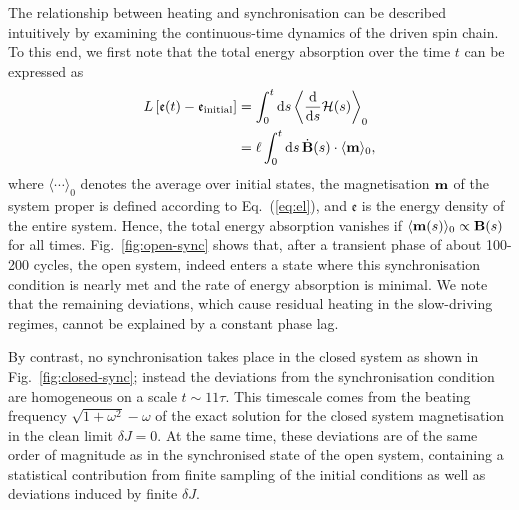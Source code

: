 \documentclass[aps,pre,twocolumn,notitlepage,floats,10pt]{revtex4-1}
\def\d{\mathrm{d}}
\newcommand{\beA}{\begin{equation}\begin{aligned}}
\newcommand{\eeA}{\end{aligned}\end{equation}}
\begin{document}
The relationship between heating and synchronisation can be described
intuitively by examining the continuous-time dynamics of the driven spin chain.
To this end, we first note that the total energy absorption over the time $t$
can be expressed as
\beA
L\left[\mathfrak{e}(t) - \mathfrak{e}_{\rm initial}\right]
&=
\int_0^t \d s\left\langle \frac{\d}{\d s} \mathcal{H}(s) \right\rangle_0 \\
&=
\ell \int_0^t \d s\, \dot{\bf B}(s) \cdot \langle {\bf m} \rangle_0 ,
\label{eq:sync-condition}
\eeA
where $\langle\cdots\rangle_0$ denotes the average over initial states, the
magnetisation ${\bf m}$ of the system proper is defined according to
Eq.~(\ref{eq:el}), and $\mathfrak{e}$ is the energy density of the entire
system.
Hence, the total energy absorption vanishes if $\langle {\bf m}(s) \rangle_0
  \propto {\bf B}(s)$ for all times.
Fig.~\ref{fig:open-sync} shows that, after a transient phase of about 100-200
cycles, the open system, indeed enters a state where this synchronisation
condition is nearly met and the rate of energy absorption is minimal.
We note that the remaining deviations, which cause residual heating in the
slow-driving regimes, cannot be explained by a constant phase lag.

By contrast, no synchronisation takes place in the closed system as shown in
Fig.~\ref{fig:closed-sync}; instead the deviations from the synchronisation
condition are homogeneous on a scale $t\sim 11\tau$.
This timescale comes from the beating frequency $\sqrt{1+\omega^2}-\omega$ of
the exact solution for the closed system magnetisation in the clean limit
$\delta J = 0$.
At the same time, these deviations are of the same order of magnitude as in the
synchronised state of the open system, containing a statistical contribution
from finite sampling of the initial conditions as well as deviations induced by
finite $\delta J$.
\end{document}
